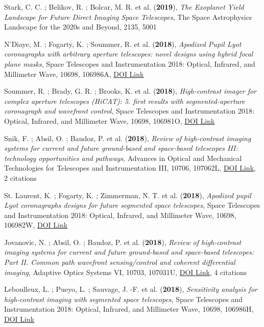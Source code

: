 \documentclass[11pt, a4paper, french]{article}
\begin{document}
\begin{etaremune} \itemsep 0pt

\item Stark, C. C. ; Belikov, R. ; Bolcar, M. R. et al. ({\bf2019}), {\it The Exoplanet Yield Landscape for Future Direct Imaging Space Telescopes}, The Space Astrophysics Landscape for the 2020s and Beyond, 2135, 5001

 \item N'Diaye, M. ; Fogarty, K. ; Soummer, R. et al. ({\bf2018}), {\it Apodized Pupil Lyot coronagraphs with arbitrary aperture telescopes: novel designs using hybrid focal plane masks}, Space Telescopes and Instrumentation 2018: Optical, Infrared, and Millimeter Wave, 10698, 106986A, \href{https://doi.org/10.1117/12.2313225}{DOI Link}

 \item Soummer, R. ; Brady, G. R. ; Brooks, K. et al. ({\bf2018}), {\it High-contrast imager for complex aperture telescopes (HiCAT): 5. first results with segmented-aperture coronagraph and wavefront control}, Space Telescopes and Instrumentation 2018: Optical, Infrared, and Millimeter Wave, 10698, 106981O, \href{https://doi.org/10.1117/12.2314110}{DOI Link}

 \item Snik, F. ; Absil, O. ; Baudoz, P. et al. ({\bf2018}), {\it Review of high-contrast imaging systems for current and future ground-based and space-based telescopes III: technology opportunities and pathways}, Advances in Optical and Mechanical Technologies for Telescopes and Instrumentation III, 10706, 107062L, \href{https://doi.org/10.1117/12.2313957}{DOI Link}, 2 citations

 \item St. Laurent, K. ; Fogarty, K. ; Zimmerman, N. T. et al. ({\bf2018}), {\it Apodized pupil Lyot coronagraphs designs for future segmented space telescopes}, Space Telescopes and Instrumentation 2018: Optical, Infrared, and Millimeter Wave, 10698, 106982W, \href{https://doi.org/10.1117/12.2313902}{DOI Link}

 \item Jovanovic, N. ; Absil, O. ; Baudoz, P. et al. ({\bf2018}), {\it Review of high-contrast imaging systems for current and future ground-based and space-based telescopes: Part II. Common path wavefront sensing/control and coherent differential imaging}, Adaptive Optics Systems VI, 10703, 107031U, \href{https://doi.org/10.1117/12.2314260}{DOI Link}, 4 citations

 \item Leboulleux, L. ; Pueyo, L. ; Sauvage, J. -F. et al. ({\bf2018}), {\it Sensitivity analysis for high-contrast imaging with segmented space telescopes}, Space Telescopes and Instrumentation 2018: Optical, Infrared, and Millimeter Wave, 10698, 106986H, \href{https://doi.org/10.1117/12.2313904}{DOI Link}


\end{etaremune}
\end{document}
